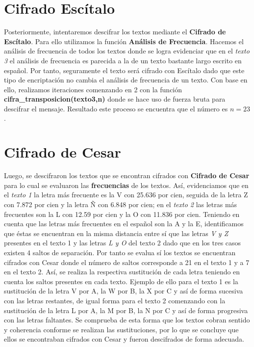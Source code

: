 \documentclass{article}
\begin{document}
\section{Cifrado Escítalo}
	Posteriormente, intentaremos descifrar los textos mediante el \textbf{Cifrado de Escítalo}. Para ello utilizamos la función \textbf{Análisis de Frecuencia}.
	Hacemos el análisis de frecuencia de todos los textos donde se logra evidenciar que en el \emph{texto 3} el análisis de frecuencia es parecida a la de un texto bastante largo escrito en español. Por tanto, seguramente el texto será cifrado con Escítalo dado que este tipo de encriptación no cambia el análisis de frecuencia de un texto.
	Con base en ello, realizamos iteraciones comenzando en 2 con la función \textbf{cifra\_transposicion(texto3,n)} donde se hace uso de fuerza bruta para descifrar el mensaje. Resultado este proceso se encuentra que el número es $n=23$.
	
\section{Cifrado de Cesar}
	Luego, se descifraron los textos que se encontran cifrados con \textbf{Cifrado de Cesar} para lo cual se evaluaron las \textbf{frecuencias} de los textos. Así, evidenciamos que en el \emph{texto 1} la letra más frecuente es la V con 25.636 por cien, seguida de la letra Z con 7.872 por cien y la letra Ñ con 6.848 por cien; en el \emph{texto 2} las letras más frecuentes son la L con 12.59 por cien y la O con 11.836 por cien.
	Teniendo en cuenta que las letras más frecuentes en el español son la A y la E, identificamos que éstas se encuentran en la misma distancia entre sí que las letras \emph{V y Z} presentes en el texto 1 y las letras \emph{L y O} del texto 2 dado que en los tres casos existen 4 saltos de separación. Por tanto se evalua sí los textos se encuentran cifrados con Cesar donde el número de saltos corresponde a 21 en el texto 1 y a 7 en el texto 2. Así, se realiza la respectiva sustitución de cada letra teniendo en cuenta los saltos presentes en cada texto. Ejemplo de ello para el texto 1 es la sustitución de la letra V por A, la W por B, la X por C y así de forma sucesiva con las letras restantes, de igual forma para el texto 2 comenzando con la sustitución de la letra L por A, la M por B, la N por C y así de forma progresiva con las letras faltantes.
	Se comprueba de esta forma que los textos cobran sentido y coherencia conforme se realizan las sustituciones, por lo que se concluye que ellos se encontraban cifrados con Cesar y fueron descifrados de forma adecuada. 
	
\end{document}
